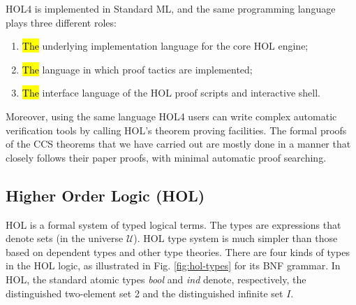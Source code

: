 HOL4 is implemented in Standard ML, and
 the same programming language
plays three different roles:
\begin{enumerate}
\item \hl{The} underlying implementation language for the core HOL engine;
\item \hl{The} language in which proof tactics are implemented;
\item \hl{The} interface language of the HOL proof scripts and interactive shell.
\end{enumerate}
Moreover, using the same language HOL4 users can write complex automatic
verification tools by calling HOL's theorem proving
facilities. The formal proofs of the CCS theorems that we have carried
out 
are mostly done in a manner that closely follows
their paper proofs, with minimal automatic proof searching.

\subsection{Higher Order Logic (HOL)}

HOL is a formal system of typed logical terms. The types are expressions that denote sets (in the
universe $\mathcal{U}$). HOL type system is much simpler than those
based on dependent types and other type theories. There are four kinds of types in the HOL
logic, as illustrated in Fig. \ref{fig:hol-types} for its BNF
grammar. In HOL, the standard atomic types \emph{bool} and \emph{ind}
 denote, respectively, the distinguished two-element set 2 and the
distinguished infinite set $I$.

\newlength{\ttX}
\settowidth{\ttX}{\tt X}
\newcommand{\tyvar}{\setlength{\unitlength}{\ttX}\begin{picture}(1,6)
\put(.5,0){\makebox(0,0)[b]{\footnotesize type variables}}
\put(0,1.5){\vector(0,1){4.5}}
\end{picture}}
\newcommand{\tyatom}{\setlength{\unitlength}{\ttX}\begin{picture}(1,6)
\put(.5,2.3){\makebox(0,0)[b]{\footnotesize atomic types}}
\put(.5,3.3){\vector(0,1){2.6}}
\end{picture}}
\newcommand{\funty}{\setlength{\unitlength}{\ttX}\begin{picture}(1,6)
\put(.5,1.5){\makebox(0,0)[b]{\footnotesize function types}}
\put(.5,0){\makebox(0,0)[b]{\footnotesize (domain $\sigma_1$, codomain $\sigma_2$)}}
\put(1,2.5){\vector(0,1){3.5}}
\end{picture}}
\newcommand{\cmpty}{\setlength{\unitlength}{\ttX}\begin{picture}(1,6)
\put(2,3.3){\makebox(0,0)[b]{\footnotesize compound types}}
\put(1.9,4.5){\vector(0,1){1.5}}
\end{picture}}

